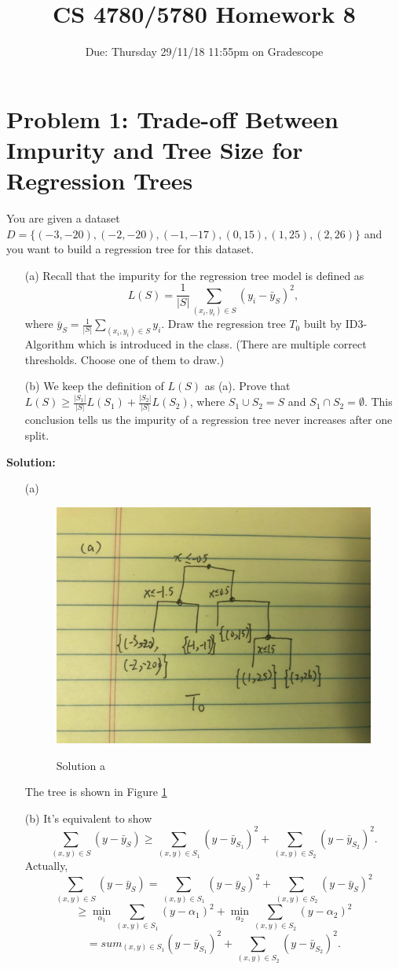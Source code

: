 \documentclass{article}
\title{CS 4780/5780 Homework 8\vspace{-10pt}}
\author{Due: Thursday 29/11/18 11:55pm on Gradescope}
\date{}
\begin{document}
    \maketitle
	\section*{Problem 1:  Trade-off Between Impurity and Tree Size for Regression Trees}
	You are given a dataset $D=\{(-3, -20), (-2, -20), (-1, -17), (0, 15), (1, 25), (2, 26)\}$ and you want to build a regression tree for this dataset.
	\begin{enumerate}
	\item[(a)] Recall that the impurity for the regression tree model is  defined as
	$$
	L(S) = \frac{1}{|S|}\sum_{(x_i, y_i)\in S}(y_i - \bar{y}_S)^2,
	$$
	where $\bar{y}_S = \frac{1}{|S|}\sum_{(x_i, y_i)\in S}y_i$. Draw the regression tree $T_0$ built by ID3-Algorithm which is introduced in the class. (There are multiple correct thresholds. Choose one of them to draw.)
	\item[(b)] We keep the definition of $L(S)$ as (a). Prove that $L(S) \geq \frac{|S_1|}{|S|}L(S_1) + \frac{|S_2|}{|S|}L(S_2)$, where $S_1 \cup S_2 = S$ and $S_1\cap S_2 = \emptyset$. This conclusion tells us the impurity of a regression tree never increases after one split.
	\end{enumerate}
	\textbf{Solution:}
	\begin{enumerate}
	\item[(a)] 
	\begin{figure}
	\centering
	\includegraphics[scale=0.15]{solution1a}
	\label{fig_solua}
	\caption{Solution a}
	\end{figure}
	The tree is shown in Figure \ref{fig_solua}
	
	
	\item[(b)] It's equivalent to show
	$$
	\sum_{(x, y)\in S}(y - \bar{y}_S) \geq \sum_{(x, y)\in S_1}(y - \bar{y}_{S_1})^2 + \sum_{(x, y)\in S_2}(y - \bar{y}_{S_2})^2. 
	$$
	Actually, 
	$$
	\sum_{(x, y)\in S}(y - \bar{y}_S) = \sum_{(x, y)\in S_1}(y - \bar{y}_{S})^2 + \sum_{(x, y)\in S_2}(y - \bar{y}_{S})^2 
	$$
	$$
	\geq \min_{\alpha_1}\sum_{(x, y)\in S_1}(y - \alpha_1)^2 +\min_{\alpha_2} \sum_{(x, y)\in S_2}(y - \alpha_2)^2
	$$
	$$
	=sum_{(x, y)\in S_1}(y - \bar{y}_{S_1})^2 + \sum_{(x, y)\in S_2}(y - \bar{y}_{S_2})^2. 
	$$
	\end{enumerate}
\end{document}

